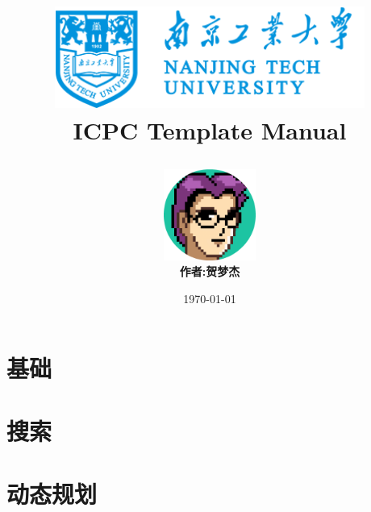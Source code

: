 \documentclass[10pt,a4paper,oneside]{book}
\title{
    \begin{center}
        \includegraphics[width=4in]{logo.png}
        \\ 
        \textbf{ICPC Template Manual}
    \end{center}
}
\author{
    \includegraphics[width=3cm]{author.png}
    \\
    \textbf{作者:贺梦杰}
}
\date{\today}
\begin{document}
    \maketitle
    \tableofcontents

    \chapter{基础}
    

    \chapter{搜索}

    \chapter{动态规划}
    
    
    




\end{document}
